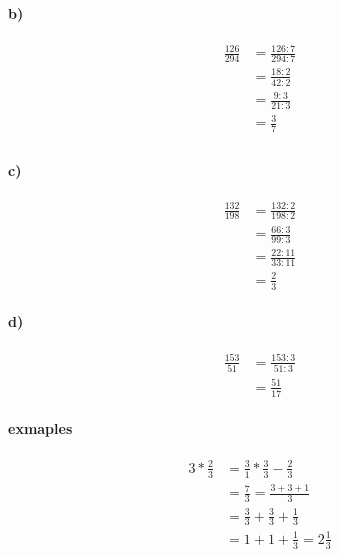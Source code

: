 \documentclass{article}
\begin{document}
\paragraph{b)}
\begin{align*}
  \frac{126}{294} &= \frac{126:7}{294:7} \\
  &= \frac{18:2}{42:2} \\
  &= \frac{9:3}{21:3} \\
  &= \frac{3}{7} \\
\end{align*}
\paragraph{c)}
\begin{align*}
  \frac{132}{198} &= \frac{132:2}{198:2} \\
  &= \frac{66:3}{99:3} \\
  &= \frac{22:11}{33:11} \\
  &= \frac{2}{3}
\end{align*}
\paragraph{d)}
\begin{align*}
  \frac{153}{51} &= \frac{153:3}{51:3} \\
  &= \frac{51}{17}
\end{align*}


\paragraph{exmaples}
\begin{align*}
  3 * \frac{2}{3} &= \frac{3}{1} * \frac{3}{3} - \frac{2}{3} \\
  &= \frac{7}{3} = \frac{3 + 3 + 1}{3} \\
  &= \frac{3}{3} + \frac{3}{3} + \frac{1}{3} \\
  &= 1 + 1 + \frac{1}{3} = 2\frac{1}{3} \\
\end{align*}
\end{document}
